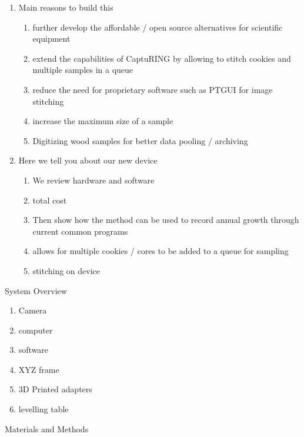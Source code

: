 \documentclass{article}
\begin{document}
\begin{outline}[enumerate]
\begin{enumerate}
	\item Main reasons to build this 
		\begin{enumerate} 
		\item further develop the affordable / open source alternatives for scientific equipment
		\item extend the capabilities of CaptuRING by allowing to stitch cookies and multiple samples in a queue
		\item reduce the need for proprietary software such as PTGUI for image stitching
		\item increase the maximum size of a sample 
		\item Digitizing wood samples for better data pooling / archiving
		\end{enumerate} 
	\item Here we tell you about our new device
		\begin{enumerate}
		\item We review hardware and software 
		\item total cost
		\item Then show how the method can be used to record annual growth through current common programs 
		\item allows for multiple cookies / cores to be added to a queue for sampling
		\item stitching on device 
		\end{enumerate}
	\end{enumerate}
\item System Overview
	\begin{enumerate}
		\item Camera
		\item computer
		\item software
		\item XYZ frame
		\item 3D Printed adapters
		\item levelling table
	\end{enumerate}
\item Materials and Methods
		\begin{enumerate}

\end{enumerate}
\end{outline}
\end{document}

